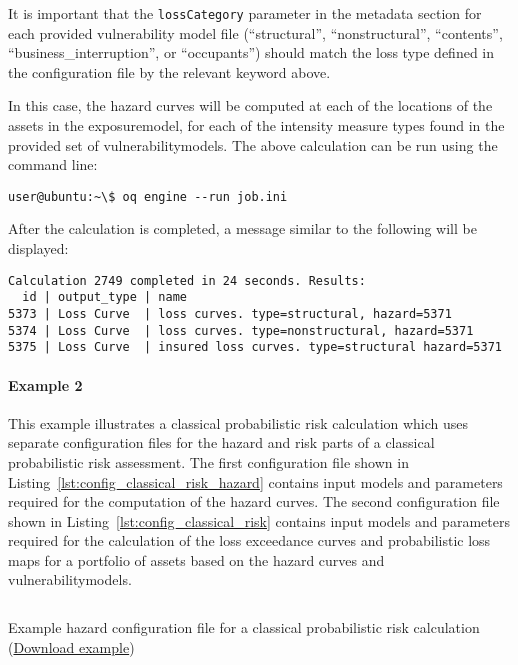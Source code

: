 It is important that the
\Verb+lossCategory+ parameter in the metadata section for each provided
vulnerability model file (``structural'', ``nonstructural'', ``contents'',
``business\_interruption'', or ``occupants'') should match the loss type
defined in the configuration file by the relevant keyword above.

In this case, the hazard curves will be computed at each of the locations of
the \glspl{asset} in the \gls{exposuremodel}, for each of the intensity
measure types found in the provided set of \glspl{vulnerabilitymodel}. The
above calculation can be run using the command line:

\begin{verbatim}
user@ubuntu:~\$ oq engine --run job.ini
\end{verbatim}

After the calculation is completed, a message similar to the following will be
displayed:

\begin{verbatim}
Calculation 2749 completed in 24 seconds. Results:
  id | output_type | name
5373 | Loss Curve  | loss curves. type=structural, hazard=5371
5374 | Loss Curve  | loss curves. type=nonstructural, hazard=5371
5375 | Loss Curve  | insured loss curves. type=structural hazard=5371
\end{verbatim}


\paragraph{Example 2}

This example illustrates a classical probabilistic risk calculation which uses
separate configuration files for the hazard and risk parts of a classical
probabilistic risk assessment. The first configuration file shown in
Listing~\ref{lst:config_classical_risk_hazard} contains input models and
parameters required for the computation of the hazard curves. The second
configuration file shown in Listing~\ref{lst:config_classical_risk} contains
input models and parameters required for the calculation of the loss
exceedance curves and probabilistic loss maps for a portfolio of \glspl{asset}
based on the hazard curves and \glspl{vulnerabilitymodel}.

\begin{listing}[htbp]
  \inputminted[firstline=1,firstnumber=1,fontsize=\footnotesize,frame=single,linenos,bgcolor=lightgray,label=job\_hazard.ini]{ini}{oqum/risk/verbatim/config_classical_hazard.ini}
  \caption{Example hazard configuration file for a classical probabilistic risk calculation (\href{https://raw.githubusercontent.com/GEMScienceTools/oq-engine-docs/master/oqum/risk/verbatim/config_classical_hazard.ini}{Download example})}
  \label{lst:config_classical_risk_hazard}
\end{listing}

